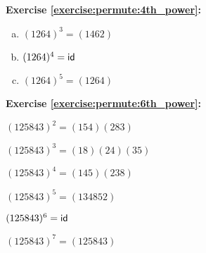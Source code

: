 \noindent\textbf{Exercise \ref{exercise:permute:4th_power}:}
\begin{multicols}{3}
\begin{enumerate}[(a)]
\item
$(1 2 6 4)^3 = (1462)$

\item
$(1 2 6 4)^4 = \sf{id}$

\item
$(1 2 6 4)^5 = (1 2 6 4)$
\end{enumerate}
\end{multicols}

\noindent\textbf{Exercise \ref{exercise:permute:6th_power}:}
\begin{enumerate}[{a.}]
\begin{multicols}{2}
\item
$(125843)^2 = (154)(283)$

\item
$(125843)^3 = (18)(24)(35)$

\item
$(125843)^4 = (145)(238)$

\item
$(125843)^5 = (134852)$

\item
$(125843)^6 = \sf{id}$

\item
$(125843)^7 = (125843)$
\end{multicols}
\end{enumerate}

